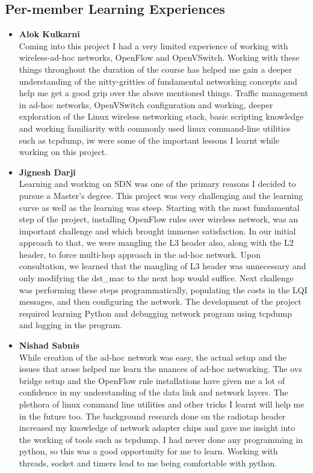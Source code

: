 \documentclass{article}
\begin{document}
\subsection{Per-member Learning Experiences}
\begin{itemize}
\item \textbf{Alok Kulkarni} \\Coming into this project I had a very limited experience of working with wireless-ad-hoc networks, OpenFlow and
OpenVSwitch. Working with these things throughout the duration of the course has helped me gain a deeper understanding
of the nitty-gritties of fundamental networking concepts and help me get a good grip over the above mentioned things.
Traffic management in ad-hoc networks, OpenVSwitch configuration and working, deeper exploration of the Linux wireless
networking stack, basic scripting knowledge and working familiarity with commonly used linux command-line utilities such
as tcpdump, iw were some of the important lessons I learnt while working on this project.
\item \textbf{Jignesh Darji} \\Learning and working on SDN was one of the primary reasons I decided to pursue a Master’s
degree. This project was very challenging and the learning curve as well as the learning was steep. Starting with the
most fundamental step of the project, installing OpenFlow rules over wireless network, was an important challenge and
which brought immense satisfaction. In our initial approach to that, we were mangling the L3 header also, along with the
L2 header, to force multi-hop approach in the ad-hoc network. Upon consultation, we learned that the mangling of L3
header was unnecessary and only modifying the dst\_mac to the next hop would suffice. Next challenge was performing these
steps programmatically, populating the costs in the LQI messages, and then configuring the network. The development of
the project required learning Python and debugging network program using tcpdump and logging in the program.  
\item \textbf{Nishad Sabnis} \\While creation of the ad-hoc network was easy, the actual setup and the issues that arose
helped me learn the nuances of ad-hoc networking. The ovs bridge setup and the OpenFlow rule installations have given me
a lot of confidence in my understanding of the data link and network layers. The plethora of linux command line
utilities and other tricks I learnt will help me in the future too. The background research done on the radiotap header
increased my knowledge of network adapter chips and gave me insight into the working of tools such as tcpdump. I had
never done any programming in python, so this was a good opportunity for me to learn. Working with threads, socket and
timers lead to me being comfortable with python.
\end{itemize}
\end{document}
